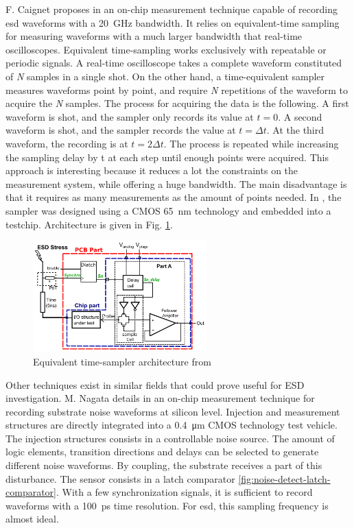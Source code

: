F. Caignet proposes in \cite{eq-time-sampling} an on-chip measurement technique capable of recording \gls{esd} waveforms with a \SI{20}{\giga\hertz} bandwidth.
It relies on equivalent-time sampling for measuring waveforms with a much larger bandwidth that real-time oscilloscopes.
Equivalent time-sampling works exclusively with repeatable or periodic signals.
A real-time oscilloscope takes a complete waveform constituted of \textit{N} samples in a single shot.
On the other hand, a time-equivalent sampler measures waveforms point by point, and require \textit{N} repetitions of the waveform to acquire the \textit{N} samples.
The process for acquiring the data is the following.
A first waveform is shot, and the sampler only records its value at $t=0$.
A second waveform is shot, and the sampler records the value at $t=\Delta t$.
At the third waveform, the recording is at $t=2\Delta t$.
The process is repeated while increasing the sampling delay by \textDelta{}t at each step until enough points were acquired.
This approach is interesting because it reduces a lot the constraints on the measurement system, while offering a huge bandwidth.
The main disadvantage is that it requires as many measurements as the amount of points needed.
In \cite{eq-time-sampling}, the sampler was designed using a CMOS \SI{65}{\nano\metre} technology and embedded into a testchip.
Architecture is given in Fig. \ref{fig:eq-time-sampler-architecture}.

\begin{figure}[!h]
  \centering
  \includegraphics[width=0.6\textwidth]{src/1/figures/architecture_equivalent_time_sampler.png}
  \caption{Equivalent time-sampler architecture from \cite{eq-time-sampling}}
  \label{fig:eq-time-sampler-architecture}
\end{figure}

Other techniques exist in similar fields that could prove useful for ESD investigation.
M. Nagata details in \cite{substrate-noise-measurement} an on-chip measurement technique for recording substrate noise waveforms at silicon level.
Injection and measurement structures are directly integrated into a \SI{0.4}{\micro\metre} CMOS technology test vehicle.
The injection structures consists in a controllable noise source.
The amount of logic elements, transition directions and delays can be selected to generate different noise waveforms.
By coupling, the substrate receives a part of this disturbance.
The sensor consists in a latch comparator \ref{fig:noise-detect-latch-comparator}.
With a few synchronization signals, it is sufficient to record waveforms with a \SI{100}{\pico\second} time resolution.
For \gls{esd}, this sampling frequency is almost ideal.

